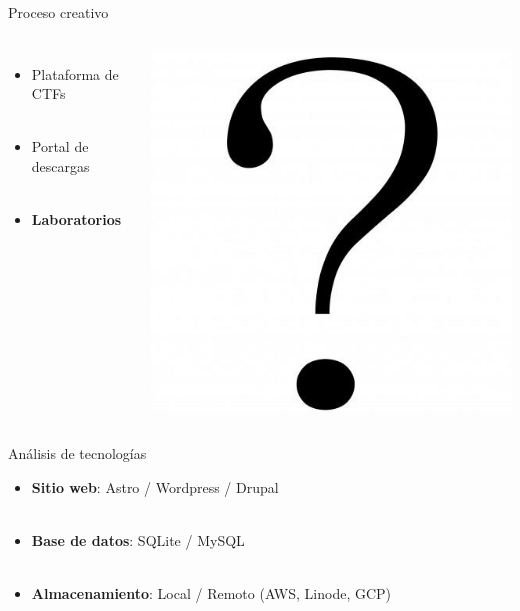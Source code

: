     \begin{frame}{Proceso creativo}
        \begin{columns}[c]
                \begin{itemize}
                    \item Plataforma de CTFs
                    \\~\\
                    \item Portal de descargas
                    \\~\\
                    \item \textbf{Laboratorios}
                \end{itemize}
            
                \includegraphics[scale=0.25]{images/interrogacion.png}
        \end{columns}
    \end{frame}

    \begin{frame}{Análisis de tecnologías}
        \begin{itemize}
            \item \textbf{Sitio web}: Astro / Wordpress / Drupal
            \\~\\
            \item \textbf{Base de datos}: SQLite / MySQL
            \\~\\
            \item \textbf{Almacenamiento}: Local / Remoto (AWS, Linode, GCP) 
        \end{itemize}
    \end{frame}


